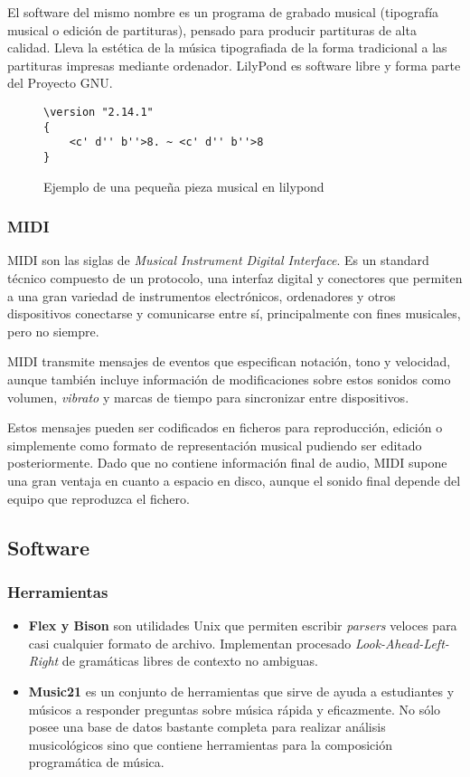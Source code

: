 El software del mismo nombre es un programa de grabado musical (tipografía musical o edición de partituras), pensado para producir partituras de alta calidad. Lleva la estética de la música tipografiada de la forma tradicional a las partituras impresas mediante ordenador. LilyPond es software libre y forma parte del Proyecto GNU. 

\begin{figure}[h!]
	\centering
\begin{Verbatim}[frame=single]
\version "2.14.1"
{
	<c' d'' b''>8. ~ <c' d'' b''>8
}
\end{Verbatim}
	\caption{Ejemplo de una pequeña pieza musical en lilypond}
	\label{fig:partitura_lilypond}
\end{figure}



\subsubsection{MIDI}
MIDI son las siglas de \textit{Musical Instrument Digital Interface}. Es un standard técnico compuesto de un protocolo, una interfaz digital y conectores que permiten a una gran variedad de instrumentos electrónicos, ordenadores y otros dispositivos conectarse y comunicarse entre sí, principalmente con fines musicales, pero no siempre.

MIDI transmite mensajes de eventos que especifican notación, tono y velocidad, aunque también incluye información de modificaciones sobre estos sonidos como volumen, \textit{vibrato} y marcas de tiempo para sincronizar entre dispositivos. 

Estos mensajes pueden ser codificados en ficheros para reproducción, edición o simplemente como formato de representación musical pudiendo ser editado posteriormente. Dado que no contiene información final de audio, MIDI supone una gran ventaja en cuanto a espacio en disco, aunque el sonido final depende del equipo que reproduzca el fichero.


\subsection{Software}
\label{subsec:software}
\subsubsection{Herramientas}
\begin{itemize}
	\item \textbf{Flex y Bison} son utilidades Unix que permiten escribir \textit{parsers} veloces para casi cualquier formato de archivo. Implementan procesado \textit{Look-Ahead-Left-Right} de gramáticas libres de contexto no ambiguas.
	\item \textbf{Music21} es un conjunto de herramientas que sirve de ayuda a estudiantes y músicos a responder preguntas sobre música rápida y eficazmente. No sólo posee una base de datos bastante completa para realizar análisis musicológicos sino que contiene herramientas para la composición programática de música.
\end{itemize}

